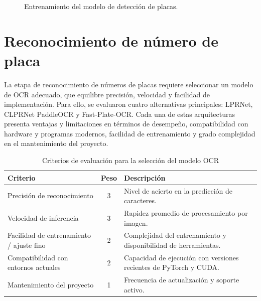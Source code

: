 \begin{figure}[h]
	\centering
	
	\caption{Entrenamiento del modelo de detección de placas.}
	\label{fig:entrenamiento-yolo}
\end{figure}

\section{Reconocimiento de número de placa}
La etapa de reconocimiento de números de placas requiere seleccionar un modelo de OCR adecuado,
que equilibre precisión, velocidad y facilidad de implementación.
Para ello, se evaluaron cuatro alternativas principales: LPRNet, CLPRNet PaddleOCR y Fast-Plate-OCR.
Cada una de estas arquitecturas presenta ventajas y limitaciones en términos de desempeño, 
compatibilidad con hardware y programas modernos,
facilidad de entrenamiento y grado complejidad en el mantenimiento del proyecto.

\begin{table}[h]
	\centering
	\begin{tabularx}{\textwidth}{l c X}
		\toprule
		\textbf{Criterio} & \textbf{Peso} & \textbf{Descripción} \\
		\midrule
		Precisión de reconocimiento & 3 & Nivel de acierto en la predicción de caracteres. \\
		Velocidad de inferencia & 3 & Rapidez promedio de procesamiento por imagen. \\
		Facilidad de entrenamiento / ajuste fino & 2 & Complejidad del entrenamiento y disponibilidad de herramientas. \\
		Compatibilidad con entornos actuales & 2 & Capacidad de ejecución con versiones recientes de PyTorch y CUDA. \\
		Mantenimiento del proyecto & 1 & Frecuencia de actualización y soporte activo. \\
		\bottomrule
	\end{tabularx}
	\caption{Criterios de evaluación para la selección del modelo OCR}
	\label{tab:ocr-criterios-evaluacion}
\end{table}


